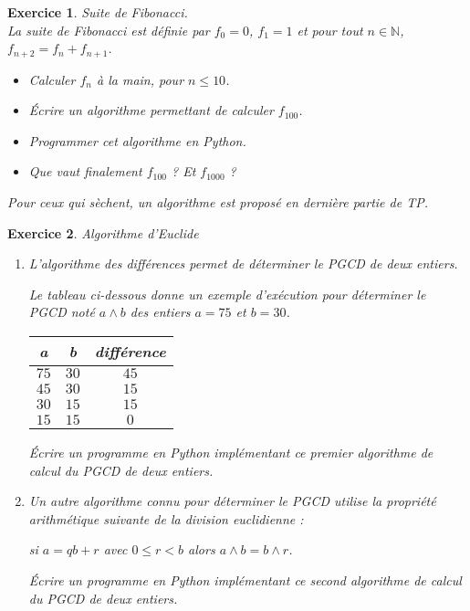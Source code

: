 \documentclass[a4paper,10pt]{article}
\newtheorem{exo}{\sc Exercice}
{\theorembodyfont{\rmfamily}\newtheorem{exo-f}{\sc Exercice}}
\newcommand{\N}{\mathbb{N}}
\renewcommand{\[}{[\![}
\renewcommand{\]}{]\!]}
\renewcommand{\leq}{\leqslant}
\renewcommand{\=}{\mathop{=}\limits}
\begin{document}
\begin{exo}\label{fibo} \emph{Suite de Fibonacci.}\\
La suite de Fibonacci est définie par $f_0=0$, $f_1=1$ et pour tout
$n\in\N$, $f_{n+2}=f_n+f_{n+1}$.
\begin{multicols}{2}
\begin{itemize}
\item Calculer $f_n$ à la main, pour $n\leq10$.
\item Écrire un algorithme permettant de calculer $f_{100}$.
\item Programmer cet algorithme en Python.
\item Que vaut finalement $f_{100}$ ? Et $f_{1000}$ ?
\end{itemize}
\end{multicols}
Pour ceux qui sèchent, un algorithme est proposé en dernière
  partie de TP.
\end{exo}



\begin{exo} \emph{Algorithme d'Euclide}



\begin{enumerate}

\item L'algorithme  des différences permet de déterminer le PGCD de deux entiers.

Le tableau ci-dessous donne un exemple d'exécution pour déterminer le PGCD noté  $a \wedge b$ des entiers $a=75$ et $b=30$.

\begin{center}
\begin{tabular}{|c|c|c|}
\hline 
a & b & différence \\ 
\hline 
$75$ & $30$ & $45$ \\ 
\hline 
$45$ & $30$ & $15$ \\ 
\hline 
$30$ & $15$ & $15$ \\ 
\hline 
$15$ & $15$ & $0$ \\ 
\hline 
\end{tabular} 
\end{center}


Écrire un programme en Python implémentant ce premier  algorithme de calcul du PGCD de deux entiers.

\item Un autre algorithme connu pour déterminer le PGCD utilise la propriété arithmétique suivante de la division euclidienne : 

si $a=qb + r$ avec $0 \leqslant r < b$ alors  $a \wedge b = b \wedge r$.

Écrire un programme en Python implémentant ce second algorithme de calcul du PGCD de deux entiers.
 
\end{enumerate}


\end{exo}
\end{document}
